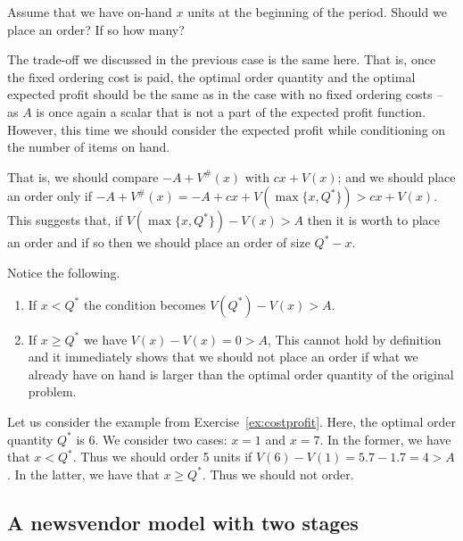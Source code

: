 \begin{exercise}
Assume that we have on-hand $x$ units at the beginning of the period. Should we place an order? If so how many?


\begin{solution}
The trade-off we discussed in the previous case is the same here. That is, once the fixed ordering cost is paid, the optimal order quantity and the optimal expected profit should be the same as in the case with no fixed ordering costs -- as $A$ is once again a scalar that is not a part of the expected profit function. However, this time we should consider the expected profit while conditioning on the number of items on hand. 

That is, we should compare $-A+V^\#(x)$ with $cx+V(x)$; and we should place an order only if $-A+V^\#(x)=-A+cx+V(\max\{x,Q^*\})>cx+V(x)$. This suggests that, if $V(\max\{x,Q^*\})-V(x)>A$ then it is worth to place an order and if so then we should place an order of size $Q^*-x$.

Notice the following.
\begin{enumerate}
\item If $x<Q^*$ the condition becomes $V(Q^*)-V(x)>A$.
\item If $x\geq Q^*$ we have $V(x)-V(x)=0>A$, This cannot hold by definition and it immediately shows that we should not place an order if what we already have on hand is larger than the optimal order quantity of the original problem.
\end{enumerate}

Let us consider the example from Exercise~\ref{ex:costprofit}. Here, the optimal order quantity $Q^*$ is 6. We consider two cases: $x=1$ and $x=7$. In the former, we have that $x<Q^*$. Thus we should order 5 units if $V(6)-V(1)=5.7-1.7=4>A$. In the latter, we have that $x\geq Q^*$. Thus we should not order.
\end{solution}
\end{exercise}


\subsection{A newsvendor model with two stages}

